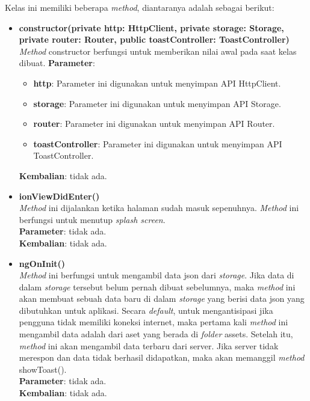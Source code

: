 \begin{enumerate}
	Kelas ini memiliki beberapa \textit{method}, diantaranya adalah sebagai berikut:
	
	\begin{itemize}
		\item \textbf{constructor(private http: HttpClient, private storage: Storage, private router: Router, public toastController: ToastController)} \\
			\textit{Method} constructor berfungsi untuk memberikan nilai awal pada saat kelas dibuat.
			\textbf{Parameter}:
			\begin{itemize}
				\item \textbf{http}: Parameter ini digunakan untuk menyimpan API HttpClient.
				\item \textbf{storage}: Parameter ini digunakan untuk menyimpan API Storage.
				\item \textbf{router}: Parameter ini digunakan untuk menyimpan API Router.
				\item \textbf{toastController}: Parameter ini digunakan untuk menyimpan API ToastController.
			\end{itemize}
			\textbf{Kembalian}: tidak ada.
		
		\item \textbf{ionViewDidEnter()}\\
			\textit{Method} ini dijalankan ketika halaman sudah masuk sepenuhnya. \textit{Method} ini berfungsi untuk menutup \textit{splash screen}. \\
			\textbf{Parameter}: tidak ada. \\
			\textbf{Kembalian}: tidak ada.
			
		\item \textbf{ngOnInit()} \\
			\textit{Method} ini berfungsi untuk mengambil data json dari \textit{storage}. Jika data di dalam \textit{storage} tersebut belum pernah dibuat sebelumnya, maka \textit{method} ini akan membuat sebuah data baru di dalam \textit{storage} yang berisi data json yang dibutuhkan untuk aplikasi. Secara \textit{default}, untuk mengantisipasi jika pengguna tidak memiliki koneksi internet, maka pertama kali \textit{method} ini mengambil data adalah dari aset yang berada di \textit{folder} assets. Setelah itu, \textit{method} ini akan mengambil data terbaru dari server. Jika server tidak merespon dan data tidak berhasil didapatkan, maka akan memanggil \textit{method} showToast(). \\
			\textbf{Parameter}: tidak ada. \\
			\textbf{Kembalian}: tidak ada.
			

\end{itemize}
\end{enumerate}
